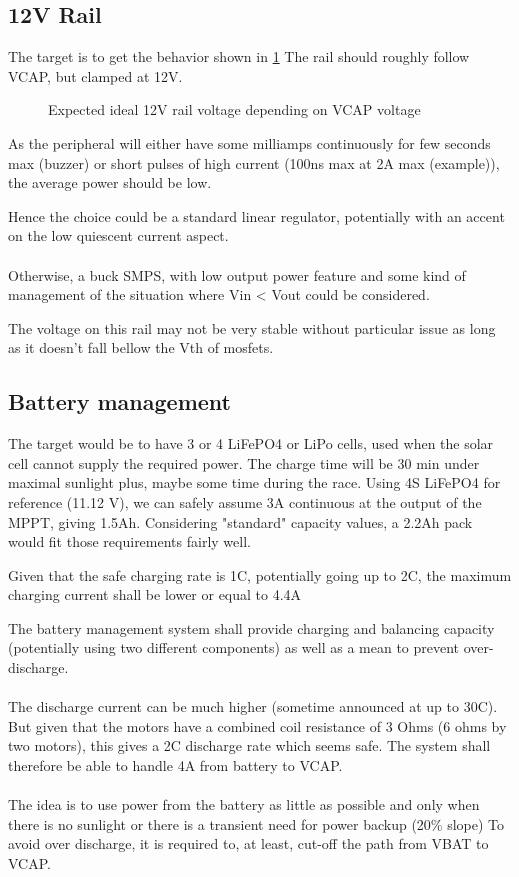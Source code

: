 \subsection{12V Rail}
The target is to get the behavior shown in \cref{fig-12v-behav}
The rail should roughly follow VCAP, but clamped at 12V.
\begin{figure}[htbp] 
    \centering
    
    \caption{Expected ideal 12V rail voltage depending on VCAP voltage}
    \label{fig-12v-behav}
\end{figure}

As the peripheral will either have some milliamps continuously for few seconds max (buzzer)
or short pulses of high current (100ns max at 2A max (example)), the average power should be low.

Hence the choice could be a standard linear regulator, potentially with an accent on the low quiescent current aspect.

\paragraph{}
Otherwise, a buck SMPS, with low output power feature and some kind of management of the situation where Vin < Vout could be considered.

The voltage on this rail may not be very stable without particular issue as long as it doesn't fall bellow the Vth of mosfets.

\subsection{Battery management}
The target would be to have 3 or 4 LiFePO4 or LiPo cells, used when the solar cell cannot supply the required power.
The charge time will be 30 min under maximal sunlight plus, maybe some time during the race.
Using 4S LiFePO4 for reference (11.12 V), we can safely assume 3A continuous at the output of the MPPT, giving 1.5Ah.
Considering "standard" capacity values, a 2.2Ah pack would fit those requirements fairly well. 

Given that the safe charging rate is 1C, potentially going up to 2C, the maximum charging current shall be lower or equal to 4.4A

The battery management system shall provide charging and balancing capacity (potentially using two different components) as well as a mean to prevent over-discharge.

\paragraph{}
The discharge current can be much higher (sometime announced at up to 30C). 
But given that the motors have a combined coil resistance of 3 Ohms (6 ohms by two motors), this gives a 2C discharge rate which seems safe.
The system shall therefore be able to handle 4A from battery to VCAP.

\paragraph{}
The idea is to use power from the battery as little as possible and only when there is no sunlight or there is a transient need for power backup (20\% slope)
To avoid over discharge, it is required to, at least, cut-off the path from VBAT to VCAP. 